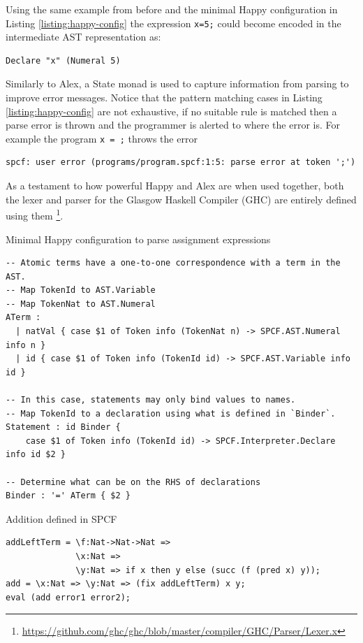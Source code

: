 \documentclass[12pt,a4paper]{report}
\theoremstyle{definition}
\theoremstyle{definition}
\theoremstyle{remark}
\begin{document}
Using the same example from before and the minimal Happy configuration in Listing \ref{listing:happy-config} the expression \lstinline{x=5;} could become encoded in the intermediate AST representation as: 
\begin{verbatim}
Declare "x" (Numeral 5)
\end{verbatim}

Similarly to Alex, a State monad is used to capture information from parsing to improve error messages. Notice that the pattern matching cases in Listing \ref{listing:happy-config} are not exhaustive, if no suitable rule is matched then a parse error is thrown and the programmer is alerted to where the error is. For example the program \lstinline{x = ;} throws the error
\begin{verbatim}
spcf: user error (programs/program.spcf:1:5: parse error at token ';')
\end{verbatim}

As a testament to how powerful Happy and Alex are when used together, both the lexer and parser for the Glasgow Haskell Compiler (GHC) are entirely defined using them \footnote{\url{https://github.com/ghc/ghc/blob/master/compiler/GHC/Parser/Lexer.x}}. 

\begin{listing}
\caption{Minimal Happy configuration to parse assignment expressions}
\begin{verbatim}
-- Atomic terms have a one-to-one correspondence with a term in the AST.
-- Map TokenId to AST.Variable
-- Map TokenNat to AST.Numeral 
ATerm :
  | natVal { case $1 of Token info (TokenNat n) -> SPCF.AST.Numeral info n }
  | id { case $1 of Token info (TokenId id) -> SPCF.AST.Variable info id }

-- In this case, statements may only bind values to names.
-- Map TokenId to a declaration using what is defined in `Binder`.
Statement : id Binder { 
    case $1 of Token info (TokenId id) -> SPCF.Interpreter.Declare info id $2 }

-- Determine what can be on the RHS of declarations
Binder : '=' ATerm { $2 }
\end{verbatim}
\label{listing:happy-config}
\end{listing}

\begin{listing}
\caption{Addition defined in SPCF}
\begin{verbatim}
addLeftTerm = \f:Nat->Nat->Nat => 
              \x:Nat => 
              \y:Nat => if x then y else (succ (f (pred x) y));
add = \x:Nat => \y:Nat => (fix addLeftTerm) x y;
eval (add error1 error2);
\end{verbatim}
\end{listing}
\end{document}
